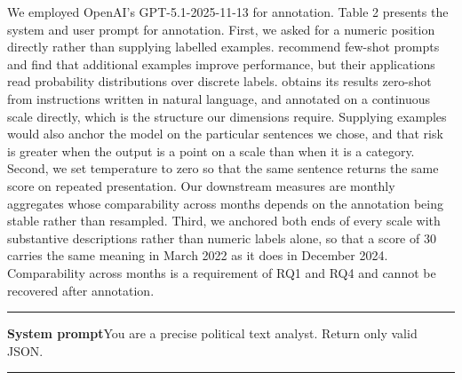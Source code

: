 We employed OpenAI's GPT-5.1-2025-11-13 for annotation. Table 2 presents the system and user prompt for annotation. First, we asked for a numeric position directly rather than supplying labelled examples. \citet{ornsteinHowTrainYour2025} recommend few-shot prompts and find that additional examples improve performance, but their applications read probability distributions over discrete labels. \citet{tornbergLargeLanguageModels2025} obtains its results zero-shot from instructions written in natural language, and \citet{mensPositioningPoliticalTexts2025} annotated on a continuous scale directly, which is the structure our dimensions require. Supplying examples would also anchor the model on the particular sentences we chose, and that risk is greater when the output is a point on a scale than when it is a category. Second, we set temperature to zero so that the same sentence returns the same score on repeated presentation. Our downstream measures are monthly aggregates whose comparability across months depends on the annotation being stable rather than resampled. Third, we anchored both ends of every scale with substantive descriptions rather than numeric labels alone, so that a score of 30 carries the same meaning in March 2022 as it does in December 2024. Comparability across months is a requirement of RQ1 and RQ4 and cannot be recovered after annotation.


\bigskip
\noindent
\noindent\begin{minipage}{\textwidth}
\label{tab:2}
\end{minipage}
\noindent\rule{\textwidth}{0.8pt}

\noindent\textbf{System prompt}\quad You are a precise political text analyst. Return only valid JSON.

\noindent\rule{\textwidth}{0.4pt}

